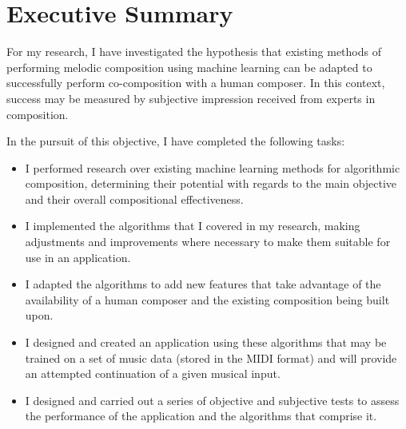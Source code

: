 \documentclass[ author={Stephen Livermore-Tozer},
				supervisor={Dr. Peter Flach},
				degree={MEng},
				title={Algorithmic Co-composition Using Machine Learning},
				subtitle={},
				type={research},
				year={2016} ]{dissertation}
\begin{document}
	
	\maketitle
	
	\frontmatter
	
	\makedecl
	
	\tableofcontents
	\listoffigures
	\listoftables
	\listofalgorithms
	\lstlistoflistings	
	
	
	\chapter*{Executive Summary}
	
	For my research, I have investigated the hypothesis that existing methods of performing melodic composition using machine learning can be adapted to successfully perform co-composition with a human composer. In this context, success may be measured by subjective impression received from experts in composition. 
	
	In the pursuit of this objective, I have completed the following tasks:
	\begin{itemize}
		\item I performed research over existing machine learning methods for algorithmic composition, determining their potential with regards to the main objective and their overall compositional effectiveness.
		\item I implemented the algorithms that I covered in my research, making adjustments and improvements where necessary to make them suitable for use in an application.
		\item I adapted the algorithms to add new features that take advantage of the availability of a human composer and the existing composition being built upon.
		\item I designed and created an application using these algorithms that may be trained on a set of music data (stored in the MIDI format) and will provide an attempted continuation of a given musical input.
		\item I designed and carried out a series of objective and subjective tests to assess the performance of the application and the algorithms that comprise it.
	\end{itemize}
	
	
	
\end{document}

